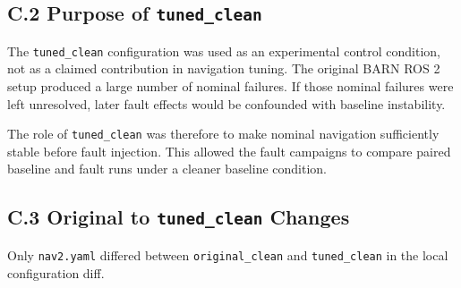 \hypertarget{c.2-purpose-of-tuned_clean}{%
\subsection{\texorpdfstring{C.2 Purpose of \texttt{tuned\_clean}}{C.2 Purpose of tuned\_clean}}\label{c.2-purpose-of-tuned_clean}}

The \texttt{tuned\_clean} configuration was used as an experimental control condition, not as a claimed contribution in navigation tuning. The original BARN ROS 2 setup produced a large number of nominal failures. If those nominal failures were left unresolved, later fault effects would be confounded with baseline instability.

The role of \texttt{tuned\_clean} was therefore to make nominal navigation sufficiently stable before fault injection. This allowed the fault campaigns to compare paired baseline and fault runs under a cleaner baseline condition.

\hypertarget{c.3-original-to-tuned_clean-changes}{%
\subsection{\texorpdfstring{C.3 Original to \texttt{tuned\_clean} Changes}{C.3 Original to tuned\_clean Changes}}\label{c.3-original-to-tuned_clean-changes}}

Only \texttt{nav2.yaml} differed between \texttt{original\_clean} and \texttt{tuned\_clean} in the local configuration diff.

